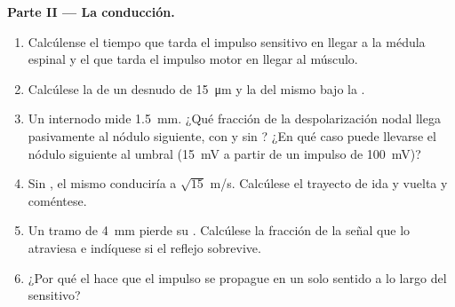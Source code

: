 \begin{problem}
\medskip
\noindent\textbf{Parte II --- La conducción.}
\begin{enumerate}[resume]
  \item Calcúlense el tiempo que tarda el impulso sensitivo en llegar a la
        médula espinal y el que tarda el impulso motor en llegar al músculo.
  \item Calcúlese la  de un  desnudo de
        \qty{15}{\micro m} y la del mismo  bajo la .
  \item Un internodo mide \qty{1.5}{mm}. ¿Qué fracción de la
        despolarización nodal llega pasivamente al nódulo siguiente, con y
        sin ? ¿En qué caso puede llevarse el nódulo siguiente al
        umbral (\qty{15}{mV} a partir de un impulso de \qty{100}{mV})?
  \item Sin , el mismo  conduciría a $\sqrt{15}$
        m/s. Calcúlese el trayecto de ida y vuelta y coméntese.
  \item Un tramo de \qty{4}{mm} pierde su . Calcúlese la
        fracción de la señal que lo atraviesa e indíquese si el reflejo
        sobrevive.
  \item ¿Por qué el  hace que el impulso se propague en
        un solo sentido a lo largo del  sensitivo?
\end{enumerate}


\end{problem}
